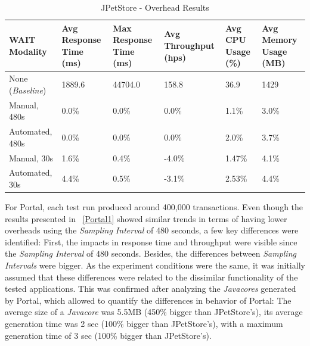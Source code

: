 \documentclass[runningheads,a4paper]{llncs}
\begin{document}
\begin{table}[!h]
\caption{JPetStore - Overhead Results}
\label{PetStore1}
\centering
\begin{tabular}{p{}|p{}|p{}|p{}|p{}|p{}}
\hline
\bfseries WAIT Modality & \bfseries Avg Response Time (ms)& \bfseries Max
Response Time (ms)& \bfseries Avg Throughput (hps)& \bfseries Avg CPU Usage
(\%) & \bfseries Avg Memory Usage (MB)\\
\hline
None (\emph{Baseline}) 	& 1889.6	& 44704.0	& 158.8 	& 36.9 		& 1429\\
Manual, 480s 			& 0.0\% 	& 0.0\%		& 0.0\%		& 1.1\% 	& 3.0\%\\
Automated, 480s 		& 0.0\%		& 0.0\%		& 0.0\% 	& 2.0\% 	& 3.7\%\\
Manual, 30s 			& 1.6\%		& 0.4\%		& -4.0\% 	& 1.47\% 	& 4.1\%\\
Automated, 30s 			& 4.4\%		& 0.5\%		& -3.1\% 	& 2.53\% 	& 4.4\%\\
\hline
\end{tabular}
\end{table}

For Portal, each test run produced around 400,000 transactions. Even though the
results presented in \tablename ~\ref{Portal1} showed similar trends in terms of
having lower overheads using the \emph{Sampling Interval} of 480 seconds, a few
key differences were identified: First, the impacts in response time and
throughput were visible since the \emph{Sampling Interval} of 480 seconds.
Besides, the differences between \emph{Sampling Intervals} were bigger. As the
experiment conditions were the same, it was initially assumed that these differences 
were related to the dissimilar functionality of the tested applications. This was confirmed 
after analyzing the \emph{Javacores} generated by Portal, which allowed to
quantify the differences in behavior of Portal: The average size of a \emph{Javacore} was
5.5MB (450\% bigger than JPetStore's), its average generation time was 2 sec
(100\% bigger than JPetStore's), with a maximum generation time of 3 sec (100\%
bigger than JPetStore's).
\end{document}

